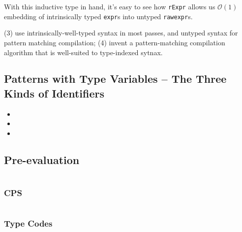 With this inductive type in hand, it's easy to see how \texttt{rExpr} allows us $\mathcal{O}(1)$ embedding of intrinsically typed \texttt{expr}s into untyped \texttt{rawexpr}s.



(3) use intrinsically-well-typed syntax in most passes, and untyped syntax for pattern matching compilation;
(4) invent a pattern-matching compilation algorithm that is well-suited to type-indexed sytnax.

\subsection{Patterns with Type Variables -- The Three Kinds of Identifiers}
\begin{itemize}
\item {}
\item {}
\item {}
\end{itemize}

\subsection{Pre-evaluation}
$\left.\right.$
\subsubsection{CPS}
$\left.\right.$
\subsubsection{Type Codes}
$\left.\right.$
